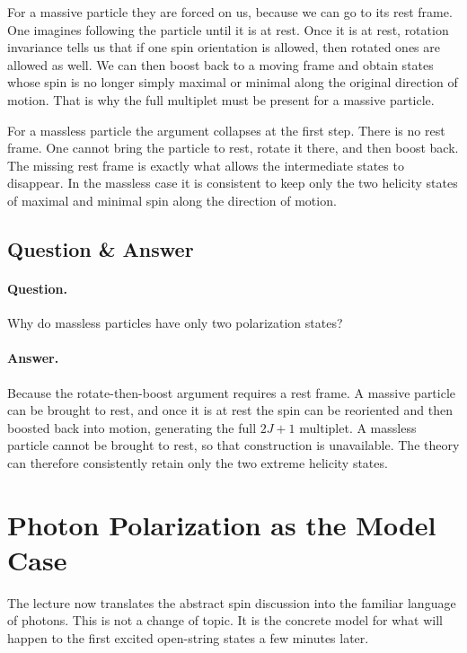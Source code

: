 For a massive particle they are forced on us, because we can go to its rest frame. One imagines following the particle until it is at rest. Once it is at rest, rotation invariance tells us that if one spin orientation is allowed, then rotated ones are allowed as well. We can then boost back to a moving frame and obtain states whose spin is no longer simply maximal or minimal along the original direction of motion. That is why the full multiplet must be present for a massive particle.

For a massless particle the argument collapses at the first step. There is no rest frame. One cannot bring the particle to rest, rotate it there, and then boost back. The missing rest frame is exactly what allows the intermediate states to disappear. In the massless case it is consistent to keep only the two helicity states of maximal and minimal spin along the direction of motion.

\subsection{Question \& Answer}

\paragraph{Question.} Why do massless particles have only two polarization states?

\paragraph{Answer.} Because the rotate-then-boost argument requires a rest frame. A massive particle can be brought to rest, and once it is at rest the spin can be reoriented and then boosted back into motion, generating the full \(2J+1\) multiplet. A massless particle cannot be brought to rest, so that construction is unavailable. The theory can therefore consistently retain only the two extreme helicity states.

\section{Photon Polarization as the Model Case}

The lecture now translates the abstract spin discussion into the familiar language of photons. This is not a change of topic. It is the concrete model for what will happen to the first excited open-string states a few minutes later.

